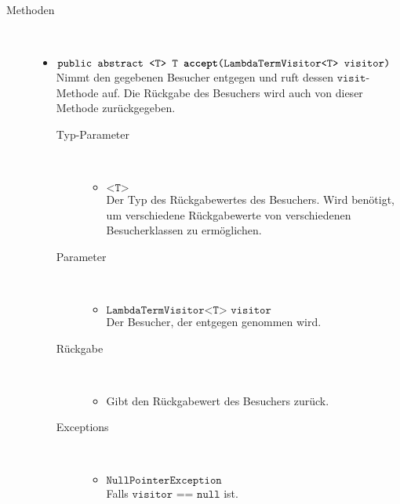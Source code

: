 \begin{description}
\item[Methoden] \hfill \\
	\vspace{-.8cm}
	\begin{itemize}
		\item $\texttt{public abstract <T> T \textbf{accept}(LambdaTermVisitor<T> visitor)}$ \\ Nimmt den gegebenen Besucher entgegen und ruft dessen $\texttt{visit}$-Methode auf. Die Rückgabe des Besuchers wird auch von dieser Methode zurückgegeben.
		\begin{description}
			\item[Typ-Parameter] \hfill \\
				\vspace{-.8cm}
				\begin{itemize}
					\item $\texttt{<T>}$ \\ Der Typ des Rückgabewertes des Besuchers. Wird benötigt, um verschiedene Rückgabewerte von verschiedenen Besucherklassen zu ermöglichen.
				\end{itemize}
			\item[Parameter] \hfill \\
			\vspace{-.8cm}
			\begin{itemize}
				\item $\texttt{LambdaTermVisitor<T> visitor}$ \\ Der Besucher, der entgegen genommen wird.
			\end{itemize}
			\item[Rückgabe] \hfill \\
			\vspace{-.8cm}
			\begin{itemize}
				\item Gibt den Rückgabewert des Besuchers zurück.
			\end{itemize}
			\item[Exceptions] \hfill \\
			\vspace{-.8cm}
			\begin{itemize}
				\item $\texttt{NullPointerException}$ \\ Falls $\texttt{visitor == null}$ ist.
			\end{itemize}
		\end{description}
		

\end{itemize}
\end{description}
